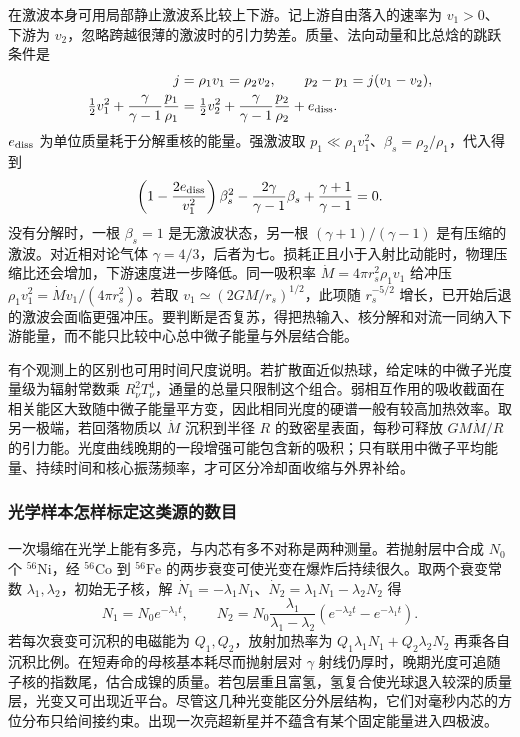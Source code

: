 在激波本身可用局部静止激波系比较上下游。记上游自由落入的速率为 $v_1>0$、下游为 $v_2$，忽略跨越很薄的激波时的引力势差。质量、法向动量和比总焓的跳跃条件是
\begin{align*}
 j&=\rho_1v_1=\rho_2v_2,\qquad
 p_2-p_1=j(v_1-v_2),\\
 \tfrac12v_1^2+\frac{\gamma}{\gamma-1}\frac{p_1}{\rho_1}
 &=\tfrac12v_2^2+\frac{\gamma}{\gamma-1}\frac{p_2}{\rho_2}
   +e_{\rm diss}.
\end{align*}
$e_{\rm diss}$ 为单位质量耗于分解重核的能量。强激波取 $p_1\ll\rho_1v_1^2$、$\beta_s=\rho_2/\rho_1$，代入得到
\[
 \left(1-\frac{2e_{\rm diss}}{v_1^2}\right)\beta_s^2
 -\frac{2\gamma}{\gamma-1}\beta_s+\frac{\gamma+1}{\gamma-1}=0 .
\]
没有分解时，一根 $\beta_s=1$ 是无激波状态，另一根 $(\gamma+1)/(\gamma-1)$ 是有压缩的激波。对近相对论气体 $\gamma=4/3$，后者为七。损耗正且小于入射比动能时，物理压缩比还会增加，下游速度进一步降低。同一吸积率 $\dot M=4\pi r_s^2\rho_1 v_1$ 给冲压 $\rho_1v_1^2=\dot M v_1/(4\pi r_s^2)$。若取 $v_1\simeq(2GM/r_s)^{1/2}$，此项随 $r_s^{-5/2}$ 增长，已开始后退的激波会面临更强冲压。要判断是否复苏，得把热输入、核分解和对流一同纳入下游能量，而不能只比较中心总中微子能量与外层结合能。

有个观测上的区别也可用时间尺度说明。若扩散面近似热球，给定味的中微子光度量级为辐射常数乘 $R_\nu^2 T_\nu^4$，通量的总量只限制这个组合。弱相互作用的吸收截面在相关能区大致随中微子能量平方变，因此相同光度的硬谱一般有较高加热效率。取另一极端，若回落物质以 $\dot M$ 沉积到半径 $R$ 的致密星表面，每秒可释放 $GM\dot M/R$ 的引力能。光度曲线晚期的一段增强可能包含新的吸积；只有联用中微子平均能量、持续时间和核心振荡频率，才可区分冷却面收缩与外界补给。

\subsubsection{光学样本怎样标定这类源的数目}

一次塌缩在光学上能有多亮，与内芯有多不对称是两种测量。若抛射层中合成 $N_0$ 个 $^{56}\mathrm{Ni}$，经 $^{56}\mathrm{Co}$ 到 $^{56}\mathrm{Fe}$ 的两步衰变可使光变在爆炸后持续很久。取两个衰变常数 $\lambda_1,\lambda_2$，初始无子核，解 $\dot N_1=-\lambda_1N_1$、$\dot N_2=\lambda_1N_1-\lambda_2N_2$ 得
\[
 N_1=N_0e^{-\lambda_1t},\qquad
 N_2=N_0\frac{\lambda_1}{\lambda_1-\lambda_2}
             (e^{-\lambda_2t}-e^{-\lambda_1t}).
\]
若每次衰变可沉积的电磁能为 $Q_1,Q_2$，放射加热率为 $Q_1\lambda_1N_1+Q_2\lambda_2N_2$ 再乘各自沉积比例。在短寿命的母核基本耗尽而抛射层对 $\gamma$ 射线仍厚时，晚期光度可追随子核的指数尾，估合成镍的质量。若包层重且富氢，氢复合使光球退入较深的质量层，光变又可出现近平台。尽管这几种光变能区分外层结构，它们对毫秒内芯的方位分布只给间接约束。出现一次亮超新星并不蕴含有某个固定能量进入四极波。

